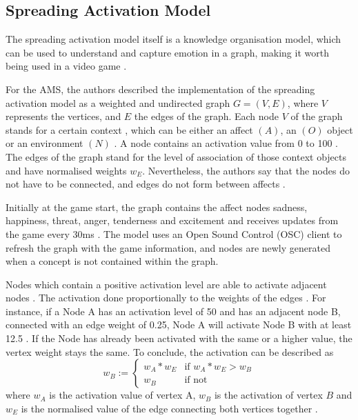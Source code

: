 \subsection{Spreading Activation Model}

The spreading activation model \cite{collins1975spreading} itself is a knowledge 
organisation model, which can be used to understand and capture emotion \cite{hutMcCormAms}\cite{carr1982words} in a graph, making it 
worth being used in a video game \cite{hutMcCormAms}.

For the AMS, the authors described the implementation
of the spreading activation model as a weighted and 
undirected graph \( G = (V, E) \)\cite{hutMcCormAms}, where 
\( V \) represents the vertices, and \( E \) the edges of the
graph. Each node \( V \) of the graph 
stands for a certain context \cite{hutMcCormAms}, which can
be either an affect \( (A) \), an  \( (O) \) object or an environment \( (N) \) \cite{hutMcCormAms}. A node
contains an activation value from 0 to 100 \cite{hutMcCormAms}. The 
edges of the graph stand for the level of  association 
of those context objects \cite{hutMcCormAms} 
and have normalised weights \( w_E\). Nevertheless, the authors
say that the nodes do not have to be connected, and edges do not 
form between affects \cite{hutMcCormAms}. 

Initially at the game
start, the graph contains the affect nodes sadness, happiness, 
threat, anger, tenderness and excitement \cite{hutMcCormAms}
and receives updates from the game every 30ms \cite{hutMcCormAms}.
The model uses an Open Sound Control (OSC) client to refresh
the graph with the game information, and nodes are newly generated
when a concept is not contained within the graph.

Nodes which contain a positive activation level are able to activate
adjacent nodes \cite{hutMcCormAms}. The activation done proportionally to the weights
of the edges \cite{hutMcCormAms}. For instance, if a Node A has an activation level
of 50 and has an adjacent node B, connected with an edge weight
of 0.25, Node A will activate Node B with at least 12.5 \cite{hutMcCormAms}. If
the Node has already been activated with the same or a higher
value, the vertex weight stays the same. To conclude, the activation
can be described as \[
w_B := 
\begin{cases} 
w_A * w_E & \text{if } w_A * w_E > w_B \\
w_B & \text{if not} 
\end{cases}
\] 
where \( w_A \) is the activation value of vertex A, \( w_B \)
is the activation of vertex \(B\) and \( w_E \) is the normalised value
of the edge connecting both vertices together \cite{hutMcCormAms}.

